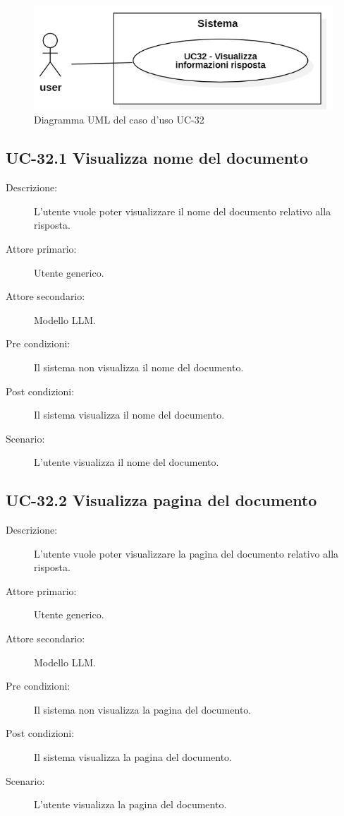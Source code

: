 \begin{figure}[H]
    \centering
    \includegraphics[width=0.9\linewidth]{UC32.PNG}
    \caption{Diagramma UML del caso d'uso UC-32}
    \label{fig:UC32}
\end{figure}

\subsection{UC-32.1 Visualizza nome del documento}
\begin{description}
    \item[Descrizione:] L'utente vuole poter visualizzare il nome del documento relativo alla risposta.
    \item[Attore primario:] Utente generico.
    \item[Attore secondario:] Modello LLM.
    \item[Pre condizioni:] Il sistema non visualizza il nome del documento.
    \item[Post condizioni:] Il sistema visualizza il nome del documento.
    \item[Scenario:] L'utente visualizza il nome del documento.
\end{description}

\subsection{UC-32.2 Visualizza pagina del documento}
\begin{description}
    \item[Descrizione:] L'utente vuole poter visualizzare la pagina del documento relativo alla risposta.
    \item[Attore primario:] Utente generico.
    \item[Attore secondario:] Modello LLM.
    \item[Pre condizioni:] Il sistema non visualizza la pagina del documento.
    \item[Post condizioni:] Il sistema visualizza la pagina del documento.
    \item[Scenario:] L'utente visualizza la pagina del documento.
\end{description}

